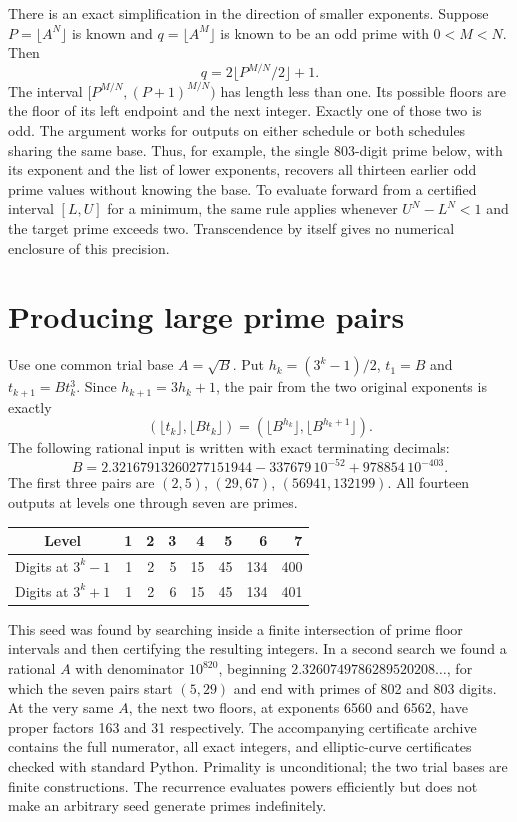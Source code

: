 \documentclass[11pt]{article}
\newcommand{\fl}[1]{\lfloor #1\rfloor}
\begin{document}
There is an exact simplification in the direction of smaller exponents. Suppose $P=\fl{A^N}$ is known and $q=\fl{A^M}$ is known to be an odd prime with $0<M<N$. Then
\[
 \boxed{q=2\fl{P^{M/N}/2}+1.}
\]
The interval $[P^{M/N},(P+1)^{M/N})$ has length less than one. Its possible floors are the floor of its left endpoint and the next integer. Exactly one of those two is odd. The argument works for outputs on either schedule or both schedules sharing the same base. Thus, for example, the single 803-digit prime below, with its exponent and the list of lower exponents, recovers all thirteen earlier odd prime values without knowing the base. To evaluate forward from a certified interval $[L,U]$ for a minimum, the same rule applies whenever $U^N-L^N<1$ and the target prime exceeds two. Transcendence by itself gives no numerical enclosure of this precision.

\section{Producing large prime pairs}
Use one common trial base $A=\sqrt B$. Put $h_k=(3^k-1)/2$, $t_1=B$ and $t_{k+1}=Bt_k^3$. Since $h_{k+1}=3h_k+1$, the pair from the two original exponents is exactly
\[
       (\fl{t_k},\fl{Bt_k})=(\fl{B^{h_k}},\fl{B^{h_k+1}}).
\]
The following rational input is written with exact terminating decimals:
\[
 B=2.32167913260277151944-337679\,10^{-52}+978854\,10^{-403}.
\]
The first three pairs are $(2,5)$, $(29,67)$, $(56941,132199)$. All fourteen outputs at levels one through seven are primes.
\begin{center}
\begin{tabular}{crrrrrrr}
\toprule
Level &1&2&3&4&5&6&7\\
\midrule
Digits at $3^k-1$ &1&2&5&15&45&134&400\\
Digits at $3^k+1$ &1&2&6&15&45&134&401\\
\bottomrule
\end{tabular}
\end{center}
This seed was found by searching inside a finite intersection of prime floor intervals and then certifying the resulting integers. In a second search we found a rational $A$ with denominator $10^{820}$, beginning $2.3260749786289520208\ldots$, for which the seven pairs start $(5,29)$ and end with primes of 802 and 803 digits. At the very same $A$, the next two floors, at exponents 6560 and 6562, have proper factors 163 and 31 respectively. The accompanying certificate archive contains the full numerator, all exact integers, and elliptic-curve certificates checked with standard Python. Primality is unconditional; the two trial bases are finite constructions. The recurrence evaluates powers efficiently but does not make an arbitrary seed generate primes indefinitely.
\end{document}
